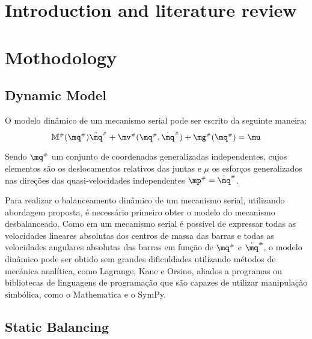 \documentclass[a4paper,11pt,brazil,fleqn]{article}
\begin{document}




\section{Introduction and literature review}\label{S01}



\section{Mothodology}\label{S02}

\subsection{Dynamic Model}\label{S02-1}

O modelo din\^{a}mico de um mecanismo serial pode ser escrito da seguinte maneira:
\begin{equation}
\mM\ssh (\mq\ssh) \ddot{\mq}\ssh + \mv\ssh(\mq\ssh,\dot{\mq}\ssh) + \mg\ssh (\mq\ssh) = \mu
\end{equation}

Sendo $\mq\ssh$ um conjunto de coordenadas generalizadas independentes, cujos elementos s\~{a}o os deslocamentos relativos das juntas e $\mu$ os esfor\c{c}os generalizados nas dire\c{c}\~oes das quasi-velocidades independentes $\mp\ssh = \dot{\mq}\ssh$.

Para realizar o balanceamento din\^{a}mico de um mecanismo serial, utilizando abordagem proposta, \'{e} necess\'{a}rio primeiro obter o modelo do mecanismo desbalanceado. Como em um mecanismo serial \'{e} poss\'{i}vel de expressar todas as velocidades lineares absolutas dos centros de massa das barras e todas as velocidades angulares absolutas das barras em fun\c{c}\~ao de $\mq\ssh$ e  $\dot{\mq}\ssh$, o modelo din\^{a}mico pode ser obtido sem grandes dificuldades utilizando m\'{e}todos de mec\'{a}nica anal\'{i}tica, como Lagrange, Kane e Orsino, aliados a programas ou bibliotecas de linguagens de programa\c{c}\~{a}o que s\~{a}o capazes de utilizar manipula\c{c}\~{a}o simb\'{o}lica, como o Mathematica e o SymPy.


\subsection{Static Balancing}\label{S02-2}
\end{document}
